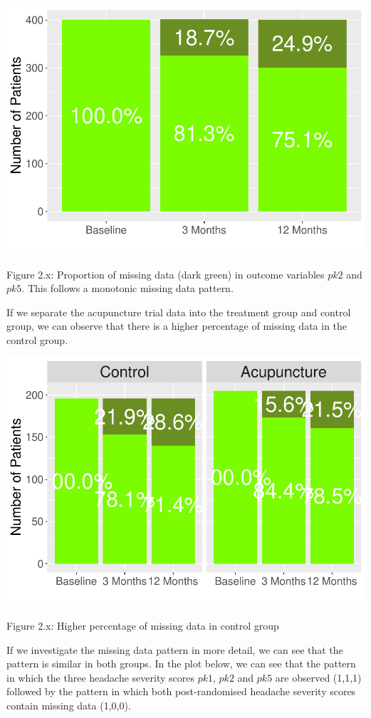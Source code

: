 \documentclass{article}
\newcommand{\pandocbounded}[1]{#1}
\begin{document}
\pandocbounded{\includegraphics[keepaspectratio]{Final_Report_files/figure-latex/unnamed-chunk-8-1.pdf}}

Figure 2.x: Proportion of missing data (dark green) in outcome variables
\(pk2\) and \(pk5\). This follows a monotonic missing data pattern.

If we separate the acupuncture trial data into the treatment group and
control group, we can observe that there is a higher percentage of
missing data in the control group.

\pandocbounded{\includegraphics[keepaspectratio]{Final_Report_files/figure-latex/unnamed-chunk-9-1.pdf}}

Figure 2.x: Higher percentage of missing data in control group

If we investigate the missing data pattern in more detail, we can see
that the pattern is similar in both groups. In the plot below, we can
see that the pattern in which the three headache severity scores
\(pk1\), \(pk2\) and \(pk5\) are observed (1,1,1) followed by the
pattern in which both post-randomised headache severity scores contain
missing data (1,0,0).
\end{document}
